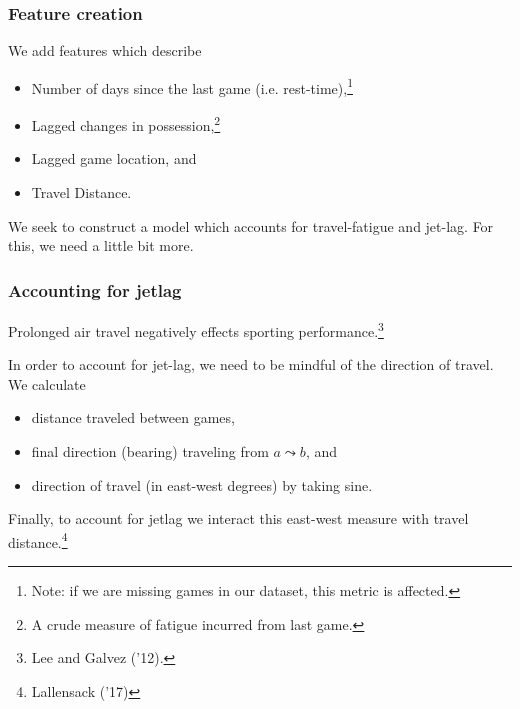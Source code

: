 \documentclass{beamer}
\begin{document}
\begin{frame}   \frametitle{Feature creation}
  We add features which describe
  \vspace{12pt}  
  \begin{itemize}     
    \item Number of days since the last game (i.e. rest-time),\footnote{Note: if we are missing games in our dataset, this metric is affected.}
    \item Lagged changes in possession,\footnote{A crude measure of fatigue incurred from last game.}
    \item Lagged game location, and
    \item Travel Distance.   
  \end{itemize}
  \vspace{12pt}We seek to construct a model which accounts for travel-fatigue and jet-lag.
  For this, we need a little bit more. \end{frame}

\begin{frame}   \frametitle{Accounting for jetlag}
  Prolonged air travel negatively effects sporting performance.\footnote{Lee and Galvez ('12).}

  \vspace{12pt}In order to account for jet-lag, we need to be mindful of the direction of travel. We calculate
  \vspace{12pt}\begin{itemize}     \item distance traveled between games,
    \item final direction (bearing) traveling from $a \leadsto b$, and
    \item direction of travel (in east-west degrees) by taking sine.
  \end{itemize}
  \vspace{12pt}Finally, to account for jetlag we interact this east-west measure with travel distance.\footnote{Lallensack ('17)} \end{frame}
\end{document}
